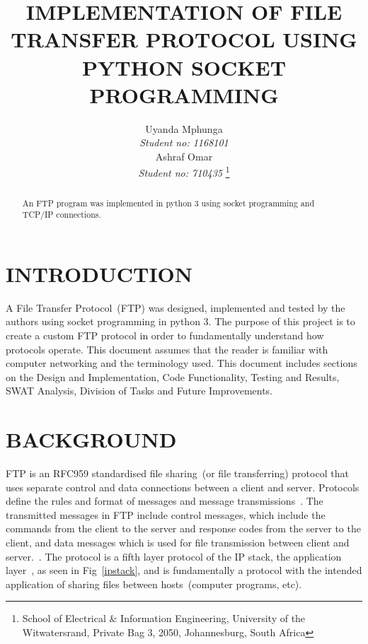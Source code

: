 \documentclass[journal, a4paper]{IEEEtran}
\begin{document}
\title{IMPLEMENTATION OF FILE TRANSFER PROTOCOL USING PYTHON SOCKET PROGRAMMING}

\author{Uyanda Mphunga \\ \textit{Student no: 1168101}\\ Ashraf Omar\\ \textit{Student no: 710435}
	\thanks{School of Electrical \& Information Engineering, University of the
		Witwatersrand, Private Bag 3, 2050, Johannesburg, South Africa}
}


%



\maketitle
\thispagestyle{empty}\pagestyle{empty}

\newlength\tindent
\setlength{\tindent}{\parindent}
\setlength{\parindent}{0pt}
\renewcommand{\indent}{\hspace*{\tindent}}

\begin{abstract}
	An FTP program was implemented in python 3 using socket programming and TCP/IP connections. 
\end{abstract}

%
\section{INTRODUCTION}
A File Transfer Protocol~(FTP) was designed, implemented and tested by the authors using socket programming in python 3. The purpose of this project is to create a custom FTP protocol in order to fundamentally understand how protocols operate. This document assumes that the reader is familiar with computer networking and the terminology used. This document includes sections on the Design and Implementation, Code Functionality, Testing and Results, SWAT Analysis, Division of Tasks and Future Improvements. 

\section{BACKGROUND}
FTP is an RFC959 \cite{rfc959} standardised file sharing~(or file transferring) protocol that uses separate control and data connections between a client and server\cite{tcp}. Protocols define the rules and format of messages and message transmissions~\cite{cn}. The transmitted messages in FTP include control messages, which include the commands from the client to the server and response codes from the server to the client, and data messages which is used for file transmission between client and server.~\cite{Bin}. The protocol is a fifth layer protocol of the IP stack, the application layer~\cite{gupta}, as seen in Fig~\ref{ipstack}, and is fundamentally a protocol with the intended application of sharing files between hosts~(computer programs, etc).
\end{document}
